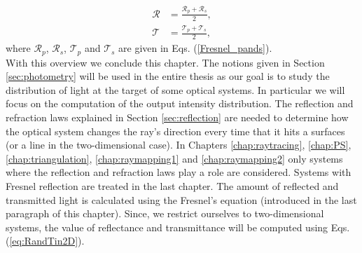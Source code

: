 \begin{equation}\begin{split}
\mathcal{R} &= \frac{\mathcal{R}_p+ \mathcal{R}_s}{2},\\
\mathcal{T} &= \frac{\mathcal{T}_p+ \mathcal{T}_s}{2}, 
\end{split}
\label{eq:RandTin2D}
\end{equation}
 where $\mathcal{R}_p$, $\mathcal{R}_s$, $\mathcal{T}_p$ and $\mathcal{T}_s$ are given in Eqs. (\ref{Fresnel_pands}). \\
\indent With this overview we conclude this chapter. The notions given in Section \ref{sec:photometry} will be used in the entire thesis as our goal is to study the distribution of light at the target of some optical systems. In particular we will focus on the computation of the output intensity distribution. The reflection and refraction laws explained in Section \ref{sec:reflection} are needed to determine how the optical system changes the ray's direction every time that it hits a surfaces (or a line in the two-dimensional case). In Chapters \ref{chap:raytracing}, \ref{chap:PS}, \ref{chap:triangulation}, \ref{chap:raymapping1} and \ref{chap:raymapping2} only systems where the reflection and refraction laws play a role are considered. Systems with Fresnel reflection are treated in the last chapter. The amount of reflected and transmitted light is calculated using the Fresnel's equation (introduced in the last paragraph of this chapter). Since, we restrict ourselves to two-dimensional systems, the value of reflectance and transmittance will be computed using Eqs. (\ref{eq:RandTin2D}).

